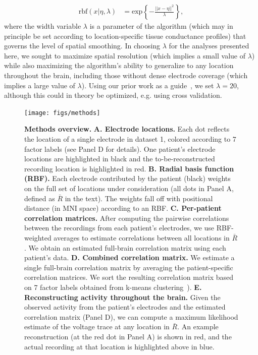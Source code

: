 \documentclass[12pt]{article}
\begin{document}
\begin{align}
  \mathrm{rbf}(x|\eta,\lambda) & =
  \mathrm{exp}\left\{ -\frac{||x - \eta||^2}{\lambda} \right\},\label{eqn:rbf}
\end{align}
where the width variable $\lambda$ is a parameter of the algorithm
(which may in principle be set according to location-specific tissue
conductance profiles) that governs the level of spatial smoothing.  In
choosing $\lambda$ for the analyses presented here, we sought to
maximize spatial resolution (which implies a small value of $\lambda$)
while also maximizing the algorithm's ability to generalize to any
location throughout the brain, including those without dense electrode
coverage (which implies a large value of $\lambda$). Using our prior
work as a guide~\cite{MannEtal14b}, we set $\lambda = 20$, although
this could in theory be optimized, e.g. using cross validation.


\begin{figure}
  \centering
  \texttt{[image: figs/methods]}
  \caption{\textbf{Methods overview.}  \textbf{A.  Electrode
      locations.}  Each dot reflects the location of a single
    electrode in dataset 1, colored according to 7 factor labels (see Panel D for details). One patient's electrode locations are
    highlighted in black and the to-be-reconstructed recording location
    is highlighted in red. \textbf{B. Radial basis function (RBF).}
    Each electrode contributed by the patient (black) weights on the
    full set of locations under consideration (all dots in Panel A,
    defined as $\bar{R}$ in the text).  The weights fall off with
    positional distance (in MNI space) according to an RBF.
    \textbf{C. Per-patient correlation matrices.}  After computing the
    pairwise correlations between the recordings from each patient's
    electrodes, we use RBF-weighted averages to estimate correlations
    between all locations in $\bar{R}$.  We obtain an estimated
    full-brain correlation matrix using each patient's
    data. \textbf{D.  Combined correlation matrix.}  We estimate a
    single full-brain correlation matrix by averaging 
    the patient-specific correlation matrices.  We sort the resulting correlation matrix based on 7 factor labels obtained from k-means clustering~\cite{YeoEtal11}). \textbf{E.
      Reconstructing activity throughout the brain.}  Given the observed
    activity from the patient's electrodes and the estimated
    correlation matrix (Panel D), we can compute a maximum likelihood
    estimate of the voltage trace at any location in $\bar{R}$.  An
    example reconstruction (at the red dot in Panel A) is shown in
    red, and the actual recording at that location is highlighted above in blue.}
  \label{fig:methods}
\end{figure}
\end{document}
